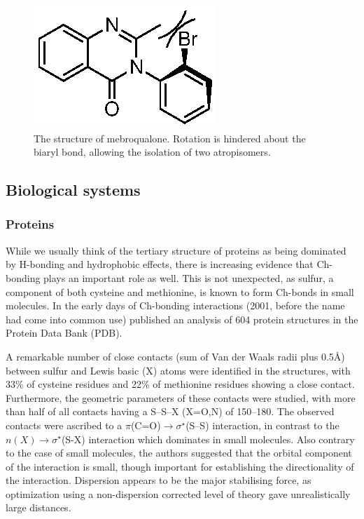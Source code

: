 \begin{refsection}
\begin{figure}
    \centering
    \includegraphics[scale=0.8]{Figures/mebroqualone.eps}
    \caption[The structure of mebroqualone.]{The structure of mebroqualone. Rotation is hindered about the biaryl bond, allowing the isolation of two atropisomers.}
    \label{fig:mebroqualone}
\end{figure}

\subsection{Biological systems}

\subsubsection{Proteins}
While we usually think of the tertiary structure of proteins as being dominated by H-bonding and hydrophobic effects, there is increasing evidence that Ch-bonding plays an important role as well.
This is not unexpected, as sulfur, a component of both cysteine and methionine, is known to form Ch-bonds in small molecules.
In the early days of Ch-bonding interactions (2001, before the name had come into common use) \citeauthor{Iwaoka2001} published an analysis of 604 protein structures in the Protein Data Bank (PDB).\autocite{Iwaoka2001}

A remarkable number of close contacts (sum of Van der Waals radii plus 0.5\AA) between sulfur and Lewis basic (X) atoms were identified in the structures, with 33\% of cysteine residues and 22\% of methionine residues showing a close contact.
Furthermore, the geometric parameters of these contacts were studied, with more than half of all contacts having a S--S--X (X=O,N) of 150--180\degree.
The observed contacts were ascribed to a $\pi$(C=O)$\rightarrow \sigma^{\star}$(S--S) interaction, in contrast to the $n(X) \rightarrow \sigma^{\star}$(S-X) interaction which dominates in small molecules.
Also contrary to the case of small molecules, the authors suggested that the orbital component of the interaction is small, though important for establishing the directionality of the interaction.
Dispersion appears to be the major stabilising force, as optimization using a non-dispersion corrected level of theory gave unrealistically large distances.


\end{refsection}
